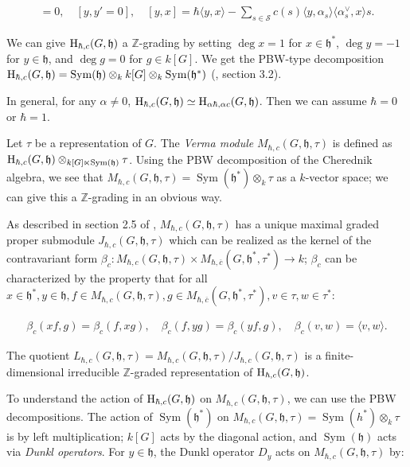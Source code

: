 \documentclass{article}
\numberwithin{equation}{section}
\newcommand{\h}{\mathfrak{h}}
\newcommand{\HH}{{\rm H}}
\newcommand{\Sym}{\operatorname{Sym}}
\begin{document}
\begin{align*}
[x,x']=0, \quad [y,y' = 0], \quad [y,x] = \hbar\langle y,x\rangle - \sum_{s \in \mathcal{S}} c(s)\langle y,\alpha_s\rangle\langle \alpha_s^\vee,x\rangle s.
\end{align*}

We can give $\HH_{\hbar,c}(G,\h)$ a $\mathbb{Z}$-grading by setting $\deg x=1$ for $x \in \h^*$, $\deg y = -1$ for $y \in \h$, and $\deg g=0$ for $g \in k[G]$. We get the PBW-type decomposition $\HH_{\hbar,c}(G,\h)=\Sym(\h) \otimes_k k[G] \otimes_k \Sym(\h^*)$ (\cite{EM}, section 3.2). 

In general, for any $\alpha \ne 0$, $\HH_{\hbar,c}(G,\h)\simeq \HH_{\alpha\hbar,\alpha c}(G,\h)$. Then we can assume $\hbar=0$ or $\hbar = 1$. 

Let $\tau$ be a representation of $G$. The {\it Verma module} $M_{\hbar,c}(G,\h,\tau)$ is defined as $\HH_{\hbar,c}(G,\h) \otimes_{k[G] \ltimes \Sym(\h)} \tau$. Using the PBW decomposition of the Cherednik algebra, we see that $M_{\hbar,c}(G,\h,\tau)=\Sym(\h^*) \otimes_k \tau$ as a $k$-vector space; we can give this a $\mathbb{Z}$-grading in an obvious way. 

As described in section 2.5 of \cite{BC1}, $M_{\hbar,c}(G,\h,\tau)$ has a unique maximal graded proper submodule $J_{\hbar,c}(G,\h,\tau)$ which can be realized as the kernel of the contravariant form $\beta_c: M_{\hbar,c}(G,\h,\tau) \times M_{\hbar,\overline{c}}(G,\h^*,\tau^*) \to k$; $\beta_c$ can be characterized by the property that for all $x \in \h^*, y \in \h, f \in M_{\hbar,c}(G,\h,\tau), g \in  M_{\hbar,\overline{c}}(G,\h^*,\tau^*), v \in \tau, w \in \tau^*$:

\begin{align*}
\beta_c(xf,g)=\beta_c(f,xg), \quad \beta_c(f,yg) = \beta_c(yf,g), \quad \beta_c(v,w) = \langle v,w\rangle.
\end{align*}

The quotient $L_{\hbar,c}(G,\h,\tau) = M_{\hbar,c}(G,\h,\tau)/J_{\hbar,c}(G,\h,\tau)$ is a finite-dimensional irreducible $\mathbb{Z}$-graded representation of $\HH_{\hbar,c}(G,\h)$.

To understand the action of $\HH_{\hbar,c}(G,\h)$ on $M_{\hbar,c}(G,\h,\tau)$, we can use the PBW decompositions. The action of $\Sym(\h^*)$ on $M_{\hbar,c}(G,\h,\tau)=\Sym(h^*)\otimes_k \tau$ is by left multiplication; $k[G]$ acts by the diagonal action, and $\Sym(\h)$ acts via {\it Dunkl operators}. For $y \in \h$, the Dunkl operator $D_y$ acts on $M_{\hbar,c}(G,\h,\tau)$ by:
\end{document}
